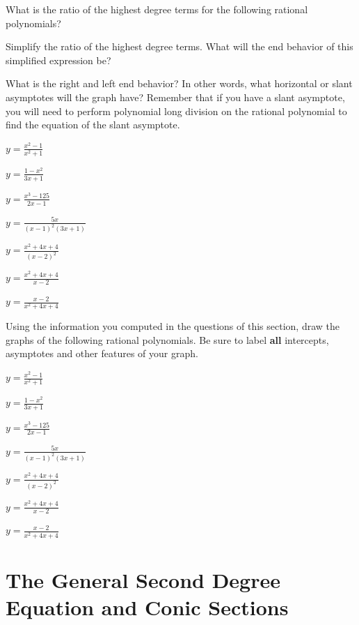 \eq

\bq \be
\item What is the ratio of the highest degree terms for the following rational polynomials?
\item Simplify the ratio of the highest degree terms. What will the end behavior of this simplified expression be?
\item What is the right and left end behavior? In other words, what horizontal or slant asymptotes will the graph have? Remember that if you have a slant asymptote, you will need to perform polynomial long division on the rational polynomial to find the equation of the slant asymptote.
\ee
\be
\item $y=\frac{x^2-1}{x^2+1}$
\item $y=\frac{1-x^2}{3x+1}$
\item $y=\frac{x^3-125}{2x-1}$
\item $y=\frac{5x}{(x-1)^2(3x+1)}$
\item $y=\frac{x^2+4x+4}{(x-2)^2}$
\item $y=\frac{x^2+4x+4}{x-2}$
\item $y=\frac{x-2}{x^2+4x+4}$
\ee
\eq

\bq Using the information you computed in the questions of this section, draw the graphs of the following rational polynomials. Be sure to label \textbf{all} intercepts, asymptotes and other features of your graph.
\be
\item $y=\frac{x^2-1}{x^2+1}$
\item $y=\frac{1-x^2}{3x+1}$
\item $y=\frac{x^3-125}{2x-1}$
\item $y=\frac{5x}{(x-1)^2(3x+1)}$
\item $y=\frac{x^2+4x+4}{(x-2)^2}$
\item $y=\frac{x^2+4x+4}{x-2}$
\item $y=\frac{x-2}{x^2+4x+4}$
\ee
\eq
\newpage

\chapter{The General Second Degree Equation and Conic Sections}

